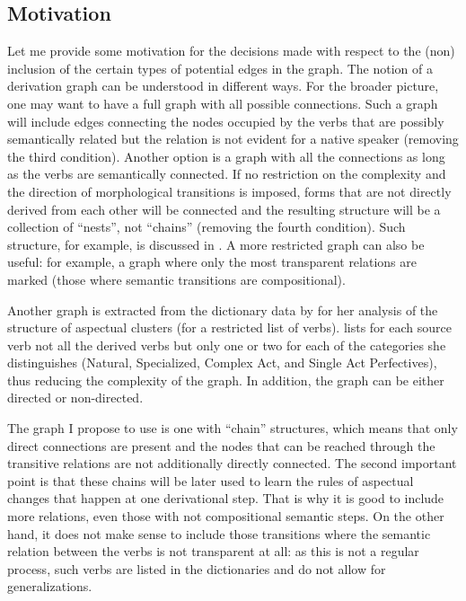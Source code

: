 \subsection{Motivation}\label{section:chains:motivation}
Let me provide some motivation for the decisions made with respect to the (non) inclusion of the certain types of potential edges in the graph. The notion of a derivation graph can be understood in different ways. For the broader picture, one may want to have a full graph with all possible connections. Such a graph will include edges connecting the nodes occupied by the verbs that are possibly semantically related but the relation is not evident for a native speaker (removing the third condition). Another option is a graph with all the connections as long as the verbs are semantically connected. If no restriction on the complexity and the direction of morphological transitions is imposed, forms that are not directly derived from each other will be connected and the resulting structure will be a collection of ``nests'', not ``chains'' (removing the fourth condition). Such structure, for example, is discussed in \citealt{Janda:10}. A more restricted graph can also be useful: for example, a graph where only the most transparent relations are marked (those where semantic transitions are compositional). 

Another graph is extracted from the dictionary data by \citet{Janda:07a} for her analysis of the structure of aspectual clusters (for a restricted list of verbs). \citeauthor{Janda:07a} lists for each source verb not all the derived verbs but only one or two for each of the categories she distinguishes (Natural, Specialized, Complex Act, and Single Act Perfectives), thus reducing the complexity of the graph. In addition, the graph can be either directed or non-directed. 
 
The graph I propose to use is one with ``chain'' structures, which means that only direct connections are present and the nodes that can be reached through the transitive relations are not additionally directly connected. The second important point is that these chains will be later used to learn the rules of aspectual changes that happen at one derivational step. That is why it is good to include more relations, even those with not compositional semantic steps. On the other hand, it does not make sense to include those transitions where the semantic relation between the verbs is not transparent at all: as this is not a regular process, such verbs are listed in the dictionaries and do not allow for generalizations. 

